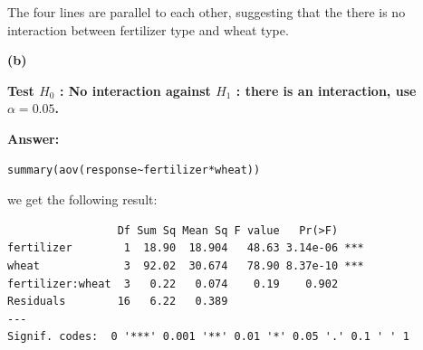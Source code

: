 \documentclass[letterpaper,11pt]{article}
\begin{document}
\begin{center}
\end{center}

The four lines are parallel to each other, suggesting that the there is no interaction between fertilizer type and wheat type.

    \bigbreak
    \begin{addmargin}[-1.1em]{0em}
    \textbf{(b)}\par\end{addmargin}
      \textbf{Test $H_0$ : No interaction against $H_1$ : there is an interaction, use $\alpha = 0.05$.}\par
    \bigbreak
    \begin{addmargin}[-0.5em]{0em}
    \textbf{Answer: }\end{addmargin}


\begin{lstlisting}
summary(aov(response~fertilizer*wheat))
\end{lstlisting}
  we get the following result:

\begin{lstlisting}
                 Df Sum Sq Mean Sq F value   Pr(>F)
fertilizer        1  18.90  18.904   48.63 3.14e-06 ***
wheat             3  92.02  30.674   78.90 8.37e-10 ***
fertilizer:wheat  3   0.22   0.074    0.19    0.902
Residuals        16   6.22   0.389
---
Signif. codes:  0 '***' 0.001 '**' 0.01 '*' 0.05 '.' 0.1 ' ' 1
\end{lstlisting}
\end{document}
